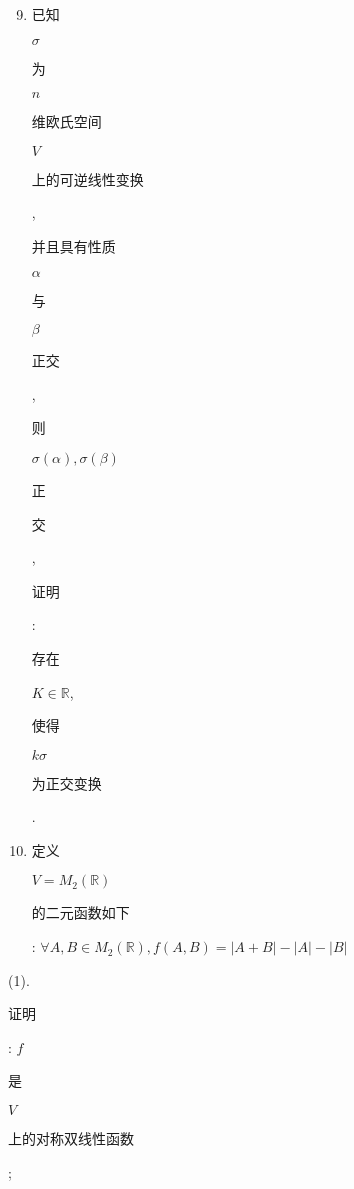 \documentclass[10pt]{article}
\begin{document}
\begin{enumerate}
  \setcounter{enumi}{8}
  \item \begin{CJK}{UTF8}{mj}已知\end{CJK} $\sigma$ \begin{CJK}{UTF8}{mj}为\end{CJK} $n$ \begin{CJK}{UTF8}{mj}维欧氏空间\end{CJK} $V$ \begin{CJK}{UTF8}{mj}上的可逆线性变换\end{CJK}, \begin{CJK}{UTF8}{mj}并且具有性质\end{CJK} $\alpha$ \begin{CJK}{UTF8}{mj}与\end{CJK} $\beta$ \begin{CJK}{UTF8}{mj}正交\end{CJK}, \begin{CJK}{UTF8}{mj}则\end{CJK} $\sigma(\alpha), \sigma(\beta)$ \begin{CJK}{UTF8}{mj}正\end{CJK} \begin{CJK}{UTF8}{mj}交\end{CJK}, \begin{CJK}{UTF8}{mj}证明\end{CJK}: \begin{CJK}{UTF8}{mj}存在\end{CJK} $K \in \mathbb{R}$, \begin{CJK}{UTF8}{mj}使得\end{CJK} $k \sigma$ \begin{CJK}{UTF8}{mj}为正交变换\end{CJK}.

  \item \begin{CJK}{UTF8}{mj}定义\end{CJK} $V=M_{2}(\mathbb{R})$ \begin{CJK}{UTF8}{mj}的二元函数如下\end{CJK}: $\forall A, B \in M_{2}(\mathbb{R}), f(A, B)=|A+B|-|A|-|B|$

\end{enumerate}
(1). \begin{CJK}{UTF8}{mj}证明\end{CJK}: $f$ \begin{CJK}{UTF8}{mj}是\end{CJK} $V$ \begin{CJK}{UTF8}{mj}上的对称双线性函数\end{CJK};
\end{document}
